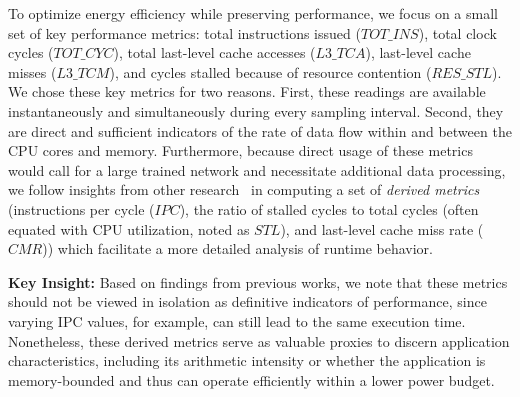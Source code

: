 To optimize energy efficiency while preserving performance, we focus on a small set of key performance metrics: total instructions issued ($TOT\_INS$), total clock cycles ($TOT\_CYC$), total last-level cache accesses ($L3\_TCA$), last-level cache misses ($L3\_TCM$), and cycles stalled because of resource contention ($RES\_STL$). We chose these key metrics for two reasons. First, these readings are available instantaneously and simultaneously during every sampling interval. Second, they are direct and sufficient indicators of the rate of data flow within and between the CPU cores and memory. Furthermore, because direct usage of these metrics would call for a large trained network and necessitate additional data processing, we follow insights from other research~\cite{wittmann2016chip,rane2014enhancing} in computing a set of \textit{derived metrics} (instructions per cycle ($IPC$), the ratio of stalled cycles to total cycles (often equated with CPU utilization, noted as $STL$), and last-level cache miss rate ($CMR$)) which facilitate a more detailed analysis of runtime behavior.  

\textbf{Key Insight:} Based on findings from previous works, we note that these metrics should not be viewed in isolation as definitive indicators of performance, since varying IPC values, for example, can still lead to the same execution time. Nonetheless, these derived metrics serve as valuable proxies to discern application characteristics, including its arithmetic intensity or whether the application is memory-bounded and thus can operate efficiently within a lower power budget.

